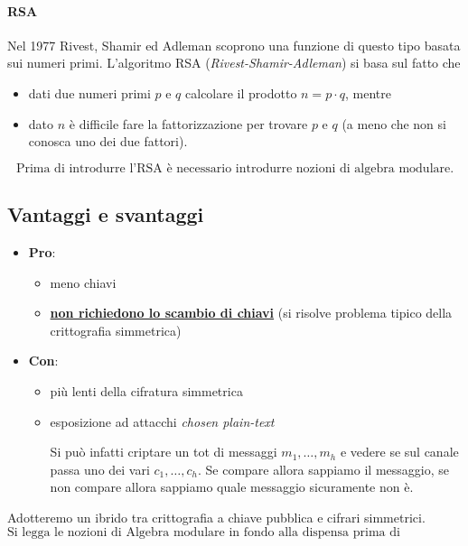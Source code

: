 \paragraph{RSA} Nel 1977 Rivest, Shamir ed Adleman scoprono una funzione di questo tipo basata sui numeri primi.
L'algoritmo RSA (\textit{Rivest-Shamir-Adleman}) si basa sul fatto che 
\begin{itemize}
	\item dati due numeri primi $p$ e $q$ calcolare il prodotto $n = p \cdot q$, mentre
	\item dato $n$ è difficile fare la fattorizzazione per trovare $p$ e $q$ (a meno che non si conosca uno dei due fattori).
\end{itemize}
\[\boxed{\text{Prima di introdurre l'RSA è necessario introdurre nozioni di algebra modulare.}}\]

\subsection{Vantaggi e svantaggi}
\begin{itemize}
	\item \textbf{Pro}:
	\begin{itemize}
		\item meno chiavi
		\item \textbf{\underline{non richiedono lo scambio di chiavi}} (si risolve problema tipico della crittografia simmetrica)
	\end{itemize}
	\item \textbf{Con}:
	\begin{itemize}
		\item più lenti della cifratura simmetrica
		\item esposizione ad attacchi \textit{chosen plain-text} 
		
		Si può infatti criptare un tot di messaggi $m_1, \dots, m_h$ e vedere se sul canale passa uno dei vari $c_1, \dots, c_h$. Se compare allora sappiamo il messaggio, se non compare allora sappiamo quale messaggio sicuramente non è.
	\end{itemize}
\end{itemize}
Adotteremo un ibrido tra crittografia a chiave pubblica e cifrari simmetrici.
\[\boxed{\text{Si legga le nozioni di Algebra modulare in fondo alla dispensa prima di proseguire.}}\]
